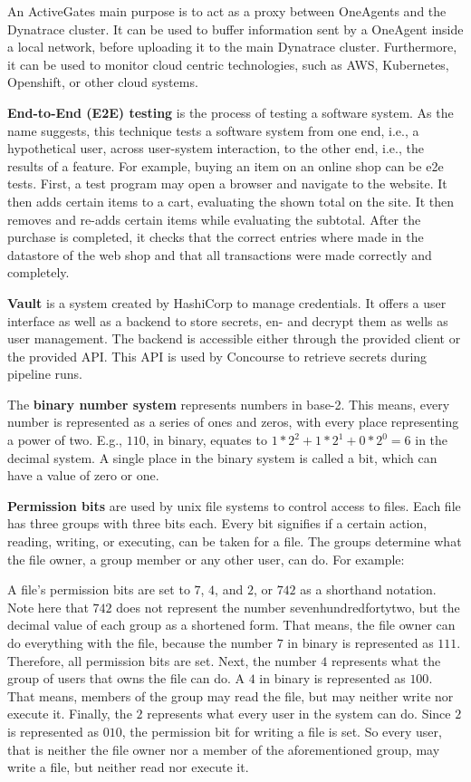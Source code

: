 An ActiveGates\cite{activegates} main purpose is to act as a proxy between OneAgents and the Dynatrace cluster.
It can be used to buffer information sent by a OneAgent inside a local network, before uploading it to the main Dynatrace cluster.
Furthermore, it can be used to monitor cloud centric technologies, such as AWS, Kubernetes, Openshift, or other cloud systems.

\textbf{End-to-End (E2E) testing}\cite{end-to-end-integration-testing-design} is the process of testing a software system.
As the name suggests, this technique tests a software system from one end, i.e., a hypothetical user, across user-system interaction, to the other end, i.e., the results of a feature.
For example, buying an item on an online shop can be e2e tests.
First, a test program may open a browser and navigate to the website.
It then adds certain items to a cart, evaluating the shown total on the site.
It then removes and re-adds certain items while evaluating the subtotal.
After the purchase is completed, it checks that the correct entries where made in the datastore of the web shop and that all transactions were made correctly and completely.

\textbf{Vault}\cite{vault} is a system created by HashiCorp to manage credentials.
It offers a user interface as well as a backend to store secrets, en- and decrypt them as wells as user management.
The backend is accessible either through the provided client or the provided API.
This API is used by Concourse to retrieve secrets during pipeline runs.

The \textbf{binary number system} represents numbers in base-2.
This means, every number is represented as a series of ones and zeros, with every place representing a power of two.
E.g., $110$, in binary, equates to $1 * 2^2 + 1 * 2^1 + 0 * 2^0 = 6$ in the decimal system.
A single place in the binary system is called a bit, which can have a value of zero or one.

\textbf{Permission bits}\cite{unix-file-permissions} are used by unix file systems to control access to files.
Each file has three groups with three bits each.
Every bit signifies if a certain action, reading, writing, or executing, can be taken for a file.
The groups determine what the file owner, a group member or any other user, can do.
For example:

A file's permission bits are set to $7$, $4$, and $2$, or $742$ as a shorthand notation.
Note here that $742$ does not represent the number sevenhundredfortytwo, but the decimal value of each group as a shortened form.
That means, the file owner can do everything with the file, because the number $7$ in binary is represented as $111$.
Therefore, all permission bits are set.
Next, the number $4$ represents what the group of users that owns the file can do.
A $4$ in binary is represented as $100$.
That means, members of the group may read the file, but may neither write nor execute it.
Finally, the $2$ represents what every user in the system can do.
Since $2$ is represented as $010$, the permission bit for writing a file is set.
So every user, that is neither the file owner nor a member of the aforementioned group, may write a file, but neither read nor execute it.

